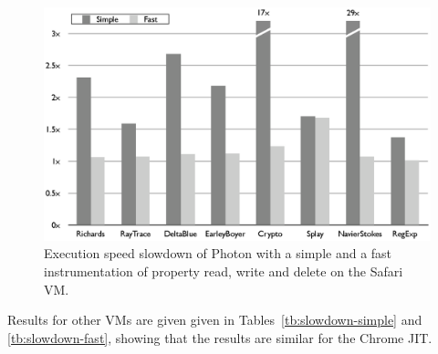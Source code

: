\begin{figure}[htbp]
\begin{center}
\includegraphics[width=.85\textwidth]{figures/InstrumentationSlowdown}
\caption[Execution speed slowdown of Photon with an instrumentation]{Execution
speed slowdown of Photon with a simple and a fast instrumentation of property
read, write and delete on the Safari VM.}
\label{fig:instr-slowdown}
\end{center}
\end{figure}


Results for other VMs are given  given in Tables~\ref{tb:slowdown-simple} and
\ref{tb:slowdown-fast}, showing that the results are similar for the Chrome
JIT. 


\FloatBarrier

